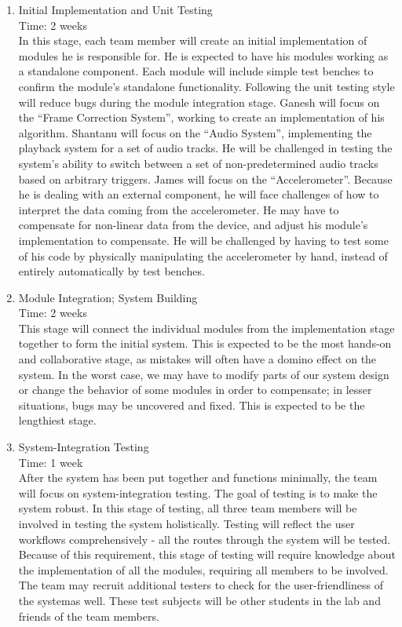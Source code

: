 \documentclass{article}
\begin{document}
\begin{enumerate}
	\item Initial Implementation and Unit Testing \hfill \\
		Time: 2 weeks \hfill \\
		In this stage, each team member will create an initial implementation of modules he is responsible for. He is expected to have his modules working as a standalone component. Each module will include simple test benches to confirm the module's standalone functionality. Following the unit testing style will reduce bugs during the module integration stage. Ganesh will focus on the ``Frame Correction System'', working to create an implementation of his algorithm. Shantanu will focus on the ``Audio System'', implementing the playback system for a set of audio tracks. He will be challenged in testing the system's ability to switch between a set of non-predetermined audio tracks based on arbitrary triggers. James will focus on the ``Accelerometer''. Because he is dealing with an external component, he will face challenges of how to interpret the data coming from the accelerometer. He may have to compensate for non-linear data from the device, and adjust his module's implementation to compensate. He will be challenged by having to test some of his code by physically manipulating the accelerometer by hand, instead of entirely automatically by test benches. 
	\item Module Integration; System Building \hfill \\
		Time: 2 weeks \hfill \\
		This stage will connect the individual modules from the implementation stage together to form the initial system. This is expected to be the most hands-on and collaborative stage, as mistakes will often have a domino effect on the system. In the worst case, we may have to modify parts of our system design or change the behavior of some modules in order to compensate; in lesser situations, bugs may be uncovered and fixed. This is expected to be the lengthiest stage.
	\item System-Integration Testing \hfill \\
		Time: 1 week \hfill \\
		After the system has been put together and functions minimally, the team will focus on system-integration testing. The goal of testing is to make the system robust. In this stage of testing, all three team members will be involved in testing the system holistically. Testing will reflect the user workflows comprehensively - all the routes through the system will be tested. Because of this requirement, this stage of testing will require knowledge about the implementation of all the modules, requiring all members to be involved. The team may recruit additional testers to check for the user-friendliness of the systemas well. These test subjects will be other students in the lab and friends of the team members. 

\end{enumerate}
\end{document}
